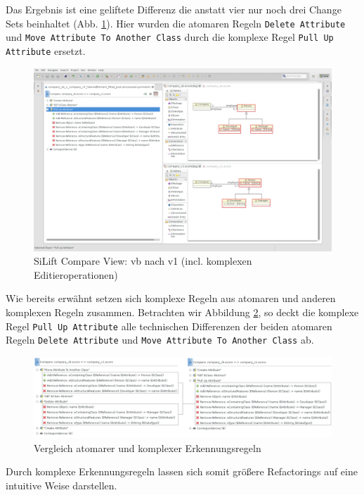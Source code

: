 Das Ergebnis ist eine geliftete Differenz die anstatt vier nur noch drei Change Sets beinhaltet  (Abb. \ref{silift-tutorial_compare_compare_view_complex}).
Hier wurden die atomaren Regeln \texttt{Delete Attribute} und \texttt{Move Attribute To Another Class} durch die komplexe Regel \texttt{Pull Up Attribute} ersetzt.

\begin{figure}[h!]
\centering
\includegraphics[width=\textwidth]{lifting/graphics/silift-tutorial_compare_compare_view_complex.png}
\caption{SiLift Compare View: vb nach v1 (incl. komplexen Editieroperationen)}
\label{silift-tutorial_compare_compare_view_complex}
\end{figure}

Wie bereits erwähnt setzen sich komplexe Regeln aus atomaren und anderen komplexen Regeln zusammen.
Betrachten wir Abbildung \ref{silift-tutorial_compare_atomic_vs_complex}, so deckt die komplexe Regel \texttt{Pull Up Attribute} alle technischen Differenzen der beiden atomaren Regeln \texttt{Delete Attribute} und \texttt{Move Attribute To Another Class} ab.

\begin{figure}[h!]
\centering
\includegraphics[width=\textwidth]{lifting/graphics/silift-tutorial_compare_atomic_vs_complex.png}
\caption{Vergleich atomarer und komplexer Erkennungsregeln}
\label{silift-tutorial_compare_atomic_vs_complex}
\end{figure}

Durch komplexe Erkennungsregeln lassen sich somit größere Refactorings auf eine intuitive Weise darstellen.\\
